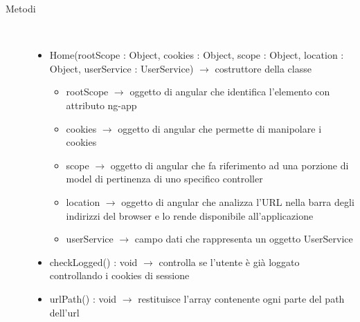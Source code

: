 \begin{description}
\item[Metodi] \hfill \\
\vspace{-7mm}
\begin{itemize}
	\item Home(rootScope : Object, cookies : Object, scope : Object, location : Object, userService : UserService) $\rightarrow$ costruttore della classe\begin{itemize}
		\item rootScope $\rightarrow$ oggetto di angular che identifica l’elemento con attributo ng-app
		\item cookies $\rightarrow$ oggetto di angular che permette di manipolare i cookies
		\item scope $\rightarrow$ oggetto di angular che fa riferimento ad una porzione di model di pertinenza di uno specifico controller
		\item location $\rightarrow$ oggetto di angular che analizza l'URL nella barra degli indirizzi del browser e lo rende disponibile all'applicazione
		\item userService $\rightarrow$ campo dati che rappresenta un oggetto UserService
	\end{itemize}
	
	\item checkLogged() : void $\rightarrow$ controlla se l'utente è già loggato controllando i cookies di sessione
	\item urlPath() : void $\rightarrow$ restituisce l'array contenente ogni parte del path dell'url
\end{itemize}

\end{description}

\vspace{0.5cm}
